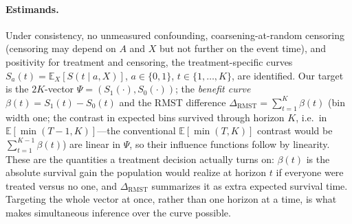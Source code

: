 \documentclass[11pt]{article}
\theoremstyle{remark}
\newcommand{\E}{\mathbb{E}}
\begin{document}
\paragraph{Estimands.} Under consistency, no unmeasured confounding, coarsening-at-random censoring (censoring may depend on $A$ and $X$ but not further on the event time), and positivity for treatment and censoring, the treatment-specific curves
$S_a(t) = \E_X[S(t \mid a, X)]$, $a\in\{0,1\}$, $t\in\{1,\dots,K\}$,
are identified. Our target is the $2K$-vector $\Psi=(S_1(\cdot), S_0(\cdot))$; the \emph{benefit curve} $\beta(t)=S_1(t)-S_0(t)$ and the RMST difference $\Delta_{\mathrm{RMST}}=\sum_{t=1}^{K}\beta(t)$ (bin width one; the contrast in expected bins survived through horizon $K$, i.e.\ in $\E[\min(T-1,K)]$---the conventional $\E[\min(T,K)]$ contrast would be $\sum_{t=1}^{K-1}\beta(t)$) are linear in $\Psi$, so their influence functions follow by linearity. These are the quantities a treatment decision actually turns on: $\beta(t)$ is the absolute survival gain the population would realize at horizon $t$ if everyone were treated versus no one, and $\Delta_{\mathrm{RMST}}$ summarizes it as extra expected survival time. Targeting the whole vector at once, rather than one horizon at a time, is what makes simultaneous inference over the curve possible.
\end{document}
